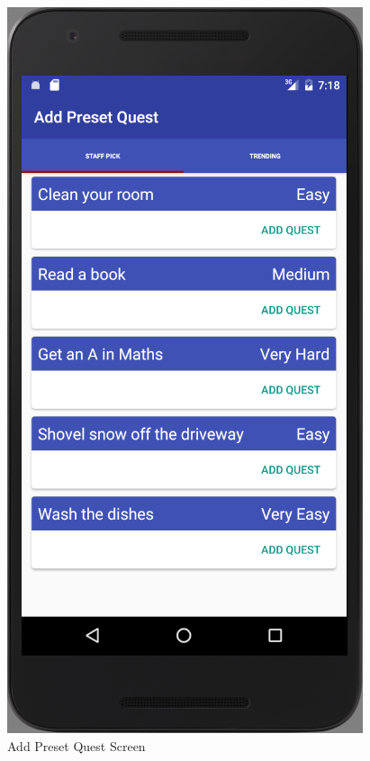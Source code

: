 \begin{figure}[ht]
\begin{minipage}[b]{0.45\linewidth}
    \includegraphics[width=.7\linewidth, frame]{../images/Screenshot/AddPresetQuestScreen.png}
    \caption{Add Preset Quest Screen} 
    \vspace{4ex}
  \end{minipage} 
\end{figure}

